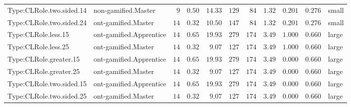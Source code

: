 \documentclass[6pt,a4paper]{article}
\begin{document}
{\begin{longtable}{llrrrrrrrrl}
Type:CLRole.two.sided.14&non-gamified.Master&$ 9$&$0.50$&$14.33$&$129$&$ 84$&$ 1.32$&$0.201$&$0.276$&small\tabularnewline
Type:CLRole.two.sided.24&ont-gamified.Master&$14$&$0.32$&$10.50$&$147$&$ 84$&$ 1.32$&$0.201$&$0.276$&small\tabularnewline
Type:CLRole.less.15&ont-gamified.Apprentice&$14$&$0.65$&$19.93$&$279$&$174$&$ 3.49$&$1.000$&$0.660$&large\tabularnewline
Type:CLRole.less.25&ont-gamified.Master&$14$&$0.32$&$ 9.07$&$127$&$174$&$ 3.49$&$1.000$&$0.660$&large\tabularnewline
Type:CLRole.greater.15&ont-gamified.Apprentice&$14$&$0.65$&$19.93$&$279$&$174$&$ 3.49$&$0.000$&$0.660$&large\tabularnewline
Type:CLRole.greater.25&ont-gamified.Master&$14$&$0.32$&$ 9.07$&$127$&$174$&$ 3.49$&$0.000$&$0.660$&large\tabularnewline
\newpage
Type:CLRole.two.sided.15&ont-gamified.Apprentice&$14$&$0.65$&$19.93$&$279$&$174$&$ 3.49$&$0.000$&$0.660$&large\tabularnewline
Type:CLRole.two.sided.25&ont-gamified.Master&$14$&$0.32$&$ 9.07$&$127$&$174$&$ 3.49$&$0.000$&$0.660$&large\tabularnewline
\hline
\end{longtable}}
\end{document}
